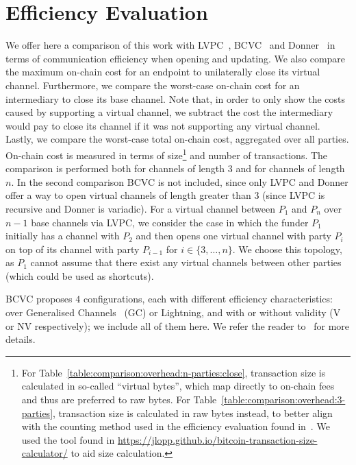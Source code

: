 \section{Efficiency Evaluation}
  \label{section:comparison}
  We offer here a comparison of this work with
  LVPC~\cite{10.1007/978-3-030-65411-5_18}, BCVC~\cite{9519487}
  and Donner~\cite{donner} in terms of communication efficiency when opening and
  updating. We also compare
  the maximum on-chain cost for an endpoint to unilaterally close its virtual
  channel. Furthermore, we compare the worst-case on-chain cost for an
  intermediary to close its base channel. Note that, in order to only show the
  costs caused by supporting a virtual channel, we subtract the cost the
  intermediary would pay to close its channel if it was not supporting any
  virtual channel. Lastly, we compare the worst-case total on-chain cost,
  aggregated over all parties. On-chain cost is measured in terms of
  size\footnote{For Table~\ref{table:comparison:overhead:n-parties:close},
  transaction size is calculated in so-called ``virtual bytes'', which map
  directly to on-chain fees and thus are preferred to raw bytes. For
  Table~\ref{table:comparison:overhead:3-parties}, transaction size is
  calculated in raw bytes instead, to better align with the counting method used
  in the efficiency evaluation found in~\cite{9519487}. We used the tool found
  in \url{https://jlopp.github.io/bitcoin-transaction-size-calculator/} to aid
  size calculation.} and number of transactions. The comparison is performed
  both for channels of length $3$ and for channels of length $n$. In the second
  comparison BCVC is not included, since only LVPC and Donner offer a way to
  open virtual channels of length greater than $3$ (since LVPC is recursive and
  Donner is variadic). For a virtual channel between $P_1$ and $P_n$ over $n-1$
  base channels via LVPC, we consider the case in which the funder $P_1$
  initially has a channel with $P_2$ and then opens one virtual channel with
  party $P_i$ on top of its channel with party $P_{i-1}$ for $i \in \{3, \dots,
  n\}$. We choose this topology, as $P_1$ cannot assume that there exist any
  virtual channels between other parties (which could be used as shortcuts).

  BCVC proposes $4$ configurations, each with different efficiency
  characteristics: over Generalised Channels~\cite{DBLP:journals/iacr/AumayrEEFHMMR20} (GC)
  or Lightning, and with or without validity (V or NV respectively); we include
  all of them here. We refer the reader to~\cite{9519487} for more
  details.


